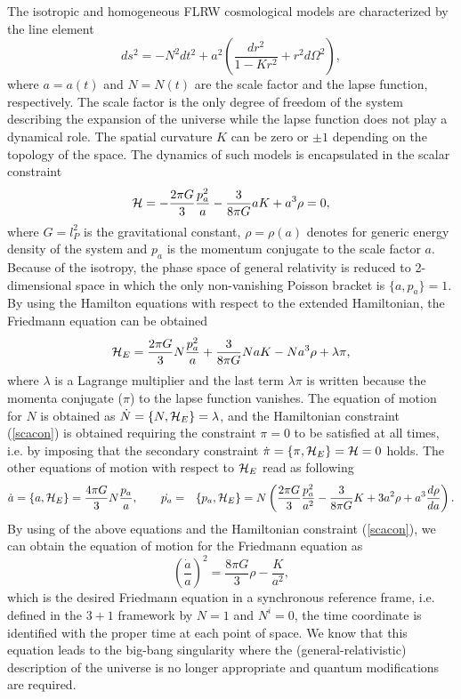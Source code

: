 \documentclass[showpacs,amsmath,nofootinbib,amssymb,epsfig]{revtex4}
\begin{document}
The isotropic and homogeneous FLRW cosmological models are characterized by the line element
\begin{equation}
ds^{2}=-N^{2}dt^{2}+a^{2}\left(\frac{dr^{2}}{1-Kr^{2}}+r^{2}d\Omega^{2}\right),
\end{equation}
where $a=a(t)$ and $N=N(t)$ are the scale factor and the lapse function, respectively. The scale factor is the only degree of freedom of the system describing the expansion of the universe while the lapse function does not play a dynamical role. The spatial curvature $K$ can be zero or $\pm1$ depending on the topology of the space. The dynamics of such models is encapsulated in the scalar constraint
\begin{equation}\label{scacon}
{\cal H}=-\frac{2\pi G}{3}\frac{p_{a}^{2}}{a}-\frac{3}{8\pi G}aK+a^{3}\rho=0,
\end{equation}
where $G=l_{P}^2$ is the gravitational constant, $\rho=\rho(a)$ denotes for generic energy density of the system and $p_{a}$ is the momentum conjugate to the scale factor $a$. Because of the isotropy, the phase space of general relativity is reduced to 2-dimensional space in which the only non-vanishing Poisson bracket is $\{a,p_{a}\}=1$. By using the Hamilton equations with respect to the extended Hamiltonian, the Friedmann equation can be obtained
\begin{equation}\label{extham}
{\cal H}_{E}=\frac{2\pi G}{3}N\frac{p_a^2}{a}+\frac{3}{8\pi G}NaK-Na^{3}\rho+\lambda\pi,
\end{equation}
where $\lambda$ is a Lagrange multiplier and the last term $\lambda\pi$ is written because the momenta conjugate ($\pi$) to the lapse function vanishes. The equation of motion for $N$ is obtained as  $\dot{N}=\{N,{\cal H}_E\}=\lambda$, and the Hamiltonian constraint (\ref{scacon}) is obtained requiring the constraint $\pi=0$ to be satisfied at all times, i.e. by imposing that the secondary constraint $\dot\pi=\{\pi,{\cal H}_E\}={\cal H}=0$ holds. The other equations of motion with respect to ${\cal H}_E$ read as following
\begin{eqnarray}\label{eqap}
\dot{a}=\{a,{\cal H}_E\}=\frac{4\pi G}{3}N\frac{p_{a}}{a}, \qquad \dot{p_{a}}&=&\{p_{a},{\cal H}_E\}= N\left(\frac{2\pi G}{3}\frac{p_{a}^2}{a^{2}}-\frac{3}{8\pi G}K+3a^{2}\rho+a^{3}\frac{d\rho}{da}\right).
\end{eqnarray}
By using of the above equations and the Hamiltonian constraint (\ref{scacon}), we can obtain the equation of motion for the Friedmann equation as
\begin{equation}\label{canfri}
\left(\frac{\dot{a}}{a}\right)^{2}=\frac{8\pi G}{3}\rho-\frac{K}{a^{2}},
\end{equation}
which is the desired Friedmann equation in a synchronous reference frame, i.e. defined in the $3+1$ framework by $N=1$ and $N^{i}=0$, the time coordinate is identified with the proper time at each point of space. We know that this equation leads to the big-bang singularity where the (general-relativistic) description of the universe is no longer appropriate and quantum modifications are required.
\end{document}
